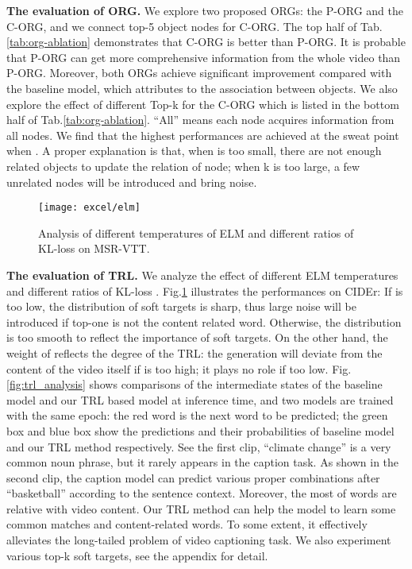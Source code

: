 \documentclass[10pt,twocolumn,letterpaper]{article}
\begin{document}
\textbf{The evaluation of ORG.} We explore two proposed ORGs: the P-ORG and the C-ORG, and we connect top-5 object nodes for C-ORG. The top half of Tab.\ref{tab:org-ablation} demonstrates that C-ORG is better than P-ORG. It is probable that P-ORG can get more comprehensive information from the whole video than P-ORG. Moreover, both ORGs achieve significant improvement compared with the baseline model, which attributes to the association between objects.
We also explore the effect of different Top-k for the C-ORG which is listed in the bottom half of Tab.\ref{tab:org-ablation}. ``All'' means each node acquires information from all nodes. We find that the highest performances are achieved at the sweat point when . A proper explanation is that, when  is too small, there are not enough related objects to update the relation of node; when k is too large, a few unrelated nodes will be introduced and bring noise.


 \begin{figure}
	\centering
	\texttt{[image: excel/elm]}
	\caption{Analysis of different temperatures of ELM and different ratios of KL-loss on MSR-VTT.}
	\label{fig:temp and kl ratio}
	\vspace{-0.5cm}
\end{figure}


\textbf{The evaluation of TRL.} We analyze the effect of different ELM temperatures  and different ratios of KL-loss . Fig.\ref{fig:temp and kl ratio} illustrates the performances on CIDEr: If  is too low, the distribution of soft targets is sharp, thus large noise will be introduced if top-one is not the content related word. Otherwise, the distribution is too smooth to reflect the importance of soft targets. On the other hand, the weight of  reflects the degree of the TRL: the generation will deviate from the content of the video itself if  is too high; it plays no role if too low. Fig.\ref{fig:trl_analysis} shows comparisons of the intermediate states of the baseline model and our TRL based model at inference time, and two models are trained with the same epoch: the red word is the next word to be predicted; the green box and blue box show the predictions and their probabilities of baseline model and our TRL method respectively. See the first clip, ``climate change'' is a very common noun phrase, but it rarely appears in the caption task. As shown in the second clip, the caption model can predict various proper combinations after ``basketball'' according to the sentence context. Moreover, the most of words are relative with video content. Our TRL method can help the model to learn some common matches and content-related words. To some extent, it effectively alleviates the long-tailed problem of video captioning task. We also experiment various top-k soft targets, see the appendix for detail.
\end{document}
